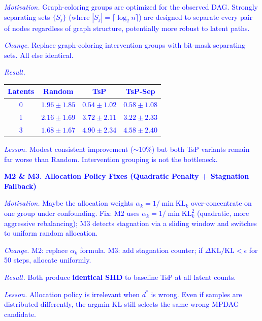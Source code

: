 \documentclass{article}
\begin{document}
\noindent\textcolor{blue}{\emph{Motivation.} Graph-coloring groups are optimized for the observed DAG. Strongly separating sets $\{S_j\}$ (where $|S_j| = \lceil \log_2 n \rceil$) are designed to separate every pair of nodes regardless of graph structure, potentially more robust to latent paths.}

\noindent\textcolor{blue}{\emph{Change.} Replace graph-coloring intervention groups with bit-mask separating sets. All else identical.}

\noindent\textcolor{blue}{\emph{Result.}
\begin{center}
\begin{tabular}{c|ccc}
\toprule
Latents & Random & TsP & TsP-Sep \\
\midrule
0 & $1.96\pm1.85$ & $0.54\pm1.02$ & $0.58\pm1.08$ \\
1 & $2.16\pm1.69$ & $3.72\pm2.11$ & $3.22\pm2.33$ \\
3 & $1.68\pm1.67$ & $4.90\pm2.34$ & $4.58\pm2.40$ \\
\bottomrule
\end{tabular}
\end{center}}

\noindent\textcolor{blue}{\emph{Lesson.} Modest consistent improvement (${\sim}10\%$) but both TsP variants remain far worse than Random. Intervention grouping is not the bottleneck.}

\bigskip

\noindent\textcolor{blue}{\textbf{M2 \& M3. Allocation Policy Fixes (Quadratic Penalty + Stagnation Fallback)}}

\noindent\textcolor{blue}{\emph{Motivation.} Maybe the allocation weights $\alpha_k = 1/\min\text{KL}_k$ over-concentrate on one group under confounding. Fix: M2 uses $\alpha_k = 1/\min\text{KL}_k^2$ (quadratic, more aggressive rebalancing); M3 detects stagnation via a sliding window and switches to uniform random allocation.}

\noindent\textcolor{blue}{\emph{Change.} M2: replace $\alpha_k$ formula. M3: add stagnation counter; if $\Delta\text{KL}/\text{KL} < \epsilon$ for 50 steps, allocate uniformly.}

\noindent\textcolor{blue}{\emph{Result.} Both produce \textbf{identical SHD} to baseline TsP at all latent counts.}

\noindent\textcolor{blue}{\emph{Lesson.} Allocation policy is irrelevant when $d^*$ is wrong. Even if samples are distributed differently, the argmin KL still selects the same wrong MPDAG candidate.}
\end{document}
